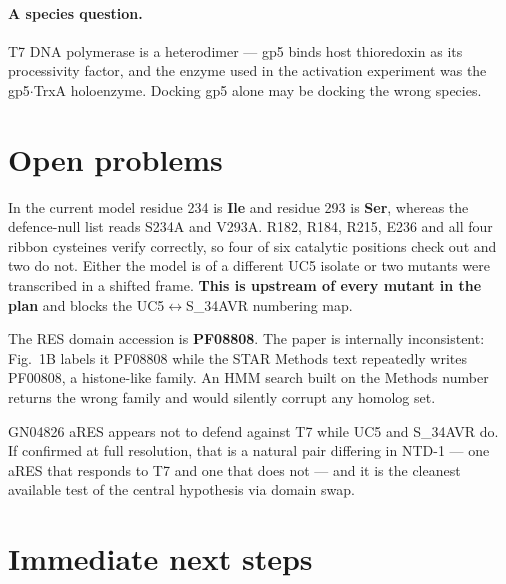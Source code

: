 \documentclass[11pt,a4paper]{article}
\begin{document}
\paragraph{A species question.} T7 DNA polymerase is a heterodimer --- gp5 binds
host thioredoxin as its processivity factor, and the enzyme used in the
activation experiment was the gp5$\cdot$TrxA holoenzyme. Docking gp5 alone may be
docking the wrong species.

\section{Open problems}
\label{sec:open}

\begin{description}\itemsep3pt
\item[A numbering discrepancy inside the UC5 frame.] In the current model residue
      234 is \textbf{Ile} and residue 293 is \textbf{Ser}, whereas the
      defence-null list reads S234A and V293A. R182, R184, R215, E236 and all
      four ribbon cysteines verify correctly, so four of six catalytic positions
      check out and two do not. Either the model is of a different UC5 isolate or
      two mutants were transcribed in a shifted frame. \textbf{This is upstream of
      every mutant in the plan} and blocks the UC5$\leftrightarrow$S\_34AVR
      numbering map.

\item[A Pfam accession error in the source paper.] The RES domain accession is
      \textbf{PF08808}. The paper is internally inconsistent: Fig.~1B labels it
      PF08808 while the STAR Methods text repeatedly writes PF00808, a
      histone-like family. An HMM search built on the Methods number returns the
      wrong family and would silently corrupt any homolog set.

\item[A matched natural pair, if it holds.] GN04826 aRES appears not to defend
      against T7 while UC5 and S\_34AVR do. If confirmed at full resolution, that
      is a natural pair differing in NTD-1 --- one aRES that responds to T7 and
      one that does not --- and it is the cleanest available test of the central
      hypothesis via domain swap.
\end{description}

\section{Immediate next steps}
\end{document}
